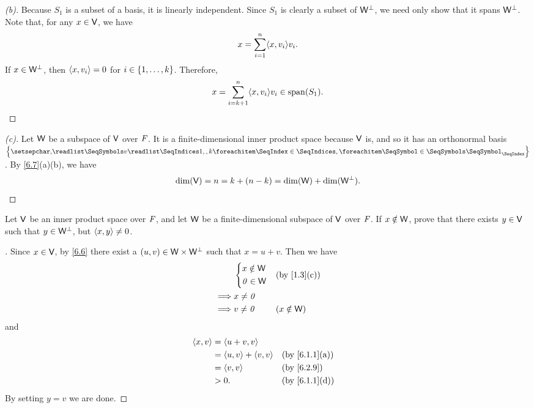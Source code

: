 \begin{proof}[(b)]
  Because \(S_1\) is a subset of a basis, it is linearly independent.
  Since \(S_1\) is clearly a subset of \(\mathsf{W}^{\perp}\), we need only show that it spans \(\mathsf{W}^{\perp}\).
  Note that, for any \(x \in \mathsf{V}\), we have
  \[
    x = \sum_{i = 1}^n \inn{x, v_i} v_i.
  \]
  If \(x \in \mathsf{W}^{\perp}\), then \(\left\langle x, v_i\right\rangle = 0\) for \(i \in \left\lbrace1, \dots, k\right\rbrace\).
  Therefore,
  \[
    x = \sum_{i = k + 1}^n \inn{x, v_i} v_i \in \spn{S_1}.
  \]
\end{proof}

\begin{proof}[(c)]
  Let \(\mathsf{W}\) be a subspace of \(\mathsf{V}\) over \(\mathit{F}\).
  It is a finite-dimensional inner product space because \(\mathsf{V}\) is, and so it has an orthonormal basis \(\set{\seq{v}{1,,k}}\).
  By \cref{6.7}(a)(b), we have
  \[
    \dim(\mathsf{V}) = n = k + (n - k) = \dim(\mathsf{W}) + \dim(\mathsf{W}^{\perp}).
  \]
\end{proof}

\exercisesection

\setcounter{ex}{5}
\begin{ex}\label{ex:6.2.6}
  Let \(\mathsf{V}\) be an inner product space over \(\mathit{F}\), and let \(\mathsf{W}\) be a finite-dimensional subspace of \(\mathsf{V}\) over \(\mathit{F}\).
  If \(x \notin \mathsf{W}\), prove that there exists \(y \in \mathsf{V}\) such that \(y \in \mathsf{W}^{\perp}\), but \(\left\langle x, y\right\rangle \neq 0\).
\end{ex}

\begin{proof}[]
  Since \(x \in \mathsf{V}\), by \cref{6.6} there exist a \((u, v) \in \mathsf{W} \times \mathsf{W}^{\perp}\) such that \(x = u + v\).
  Then we have
  \begin{align*}
             & \begin{dcases}
                 x \notin \W \\
                 \zv \in \W
               \end{dcases} &  & \text{(by \cref{1.3}(c))} \\
    \implies & x \neq \zv                                  \\
    \implies & v \neq \zv     &  & (x \notin \W)
  \end{align*}
  and
  \begin{align*}
    \inn{x, v} & = \inn{u + v, v}                                           \\
               & = \inn{u, v} + \inn{v, v} &  & \text{(by \cref{6.1.1}(a))} \\
               & = \inn{v, v}              &  & \text{(by \cref{6.2.9})}    \\
               & > 0.                      &  & \text{(by \cref{6.1.1}(d))}
  \end{align*}
  By setting \(y = v\) we are done.
\end{proof}

